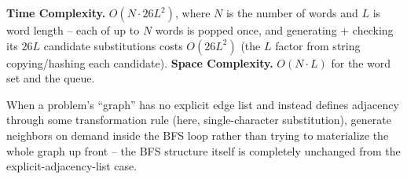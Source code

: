 \begin{complexitybox}
\textbf{Time Complexity.} $O(N \cdot 26L^2)$, where $N$ is the number
of words and $L$ is word length -- each of up to $N$ words is popped
once, and generating + checking its $26L$ candidate substitutions costs
$O(26L^2)$ (the $L$ factor from string copying/hashing each candidate).
\textbf{Space Complexity.} $O(N \cdot L)$ for the word set and the
queue.
\end{complexitybox}

\begin{takeawaybox}
When a problem's ``graph'' has no explicit edge list and instead
defines adjacency through some transformation rule (here, single-character
substitution), generate neighbors on demand inside the BFS loop rather
than trying to materialize the whole graph up front -- the BFS
structure itself is completely unchanged from the explicit-adjacency-list
case.
\end{takeawaybox}
